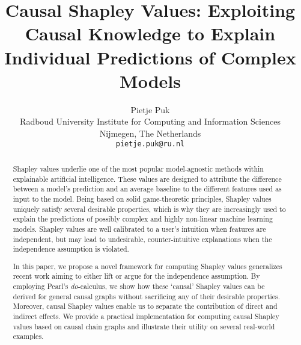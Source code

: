 \documentclass{article}
\title{Causal Shapley Values: Exploiting Causal Knowledge to Explain Individual Predictions of Complex Models}
\author{%
  Pietje Puk\\
  Radboud University
  Institute for Computing and Information Sciences\\
  Nijmegen, The Netherlands \\
  \texttt{pietje.puk@ru.nl} \\
}
\begin{document}
\maketitle

\begin{abstract}
Shapley values underlie one of the most popular model-agnostic methods within explainable artificial intelligence. These values are designed to attribute the difference between a model's prediction and an average baseline to the different features used as input to the model. Being based on solid game-theoretic principles, Shapley values uniquely satisfy several desirable properties, which is why they are increasingly used to explain the predictions of possibly complex and highly non-linear machine learning models. Shapley values are well calibrated to a user’s intuition when features are independent, but may lead to undesirable, counter-intuitive explanations when the independence assumption is violated.

In this paper, we propose a novel framework for computing Shapley values generalizes recent work aiming to either lift or argue for the independence assumption. By employing Pearl's \textit{do}-calculus, we show how these `causal' Shapley values can be derived for general causal graphs without sacrificing any of their desirable properties. Moreover, causal Shapley values enable us to separate the contribution of direct and indirect effects. We provide a practical implementation for computing causal Shapley values based on causal chain graphs and illustrate their utility on several real-world examples.
\end{abstract}






\end{document}
